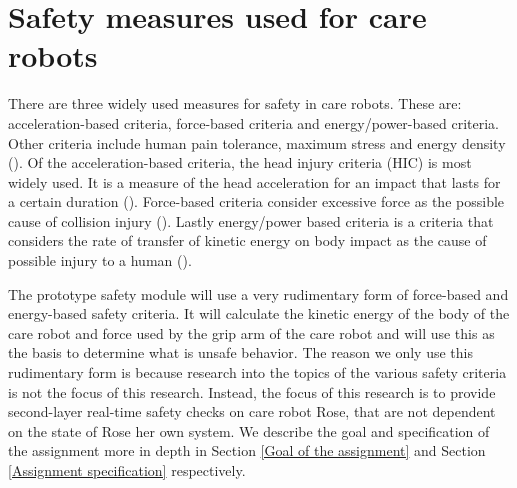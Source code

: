 \documentclass[12pt]{scrreprt}
\begin{document}
 \section{Safety measures used for care robots}
 \label{Safety in care robots}
There are three widely used measures for safety in care robots. These are: acceleration-based criteria,  force-based criteria and energy/power-based criteria. Other criteria include human pain tolerance, maximum stress and energy density (\cite{tadele}). Of the acceleration-based criteria, the head injury criteria (HIC) is most widely used. It is a measure of the head acceleration for an impact that lasts for a certain duration (\cite{hic}). Force-based criteria consider excessive force as the possible cause of collision injury (\cite{force}). Lastly energy/power based criteria is a criteria that considers the rate of transfer of kinetic energy on body impact as the cause of possible injury to a human (\cite{crucial_milestone}).
\par
The prototype safety module will use a very rudimentary form of force-based and energy-based safety criteria. It will calculate the kinetic energy of the body of the care robot and force used by the grip arm of the care robot and will use this as the basis to determine what is unsafe behavior. The reason we only use this rudimentary form is because research into the topics of the various safety criteria is not the focus of this research. Instead, the focus of this research is to provide second-layer real-time safety checks on care robot Rose, that are not dependent on the state of Rose her own system. We describe the goal and specification of the assignment more in depth in Section \ref{Goal of the assignment} and Section \ref{Assignment specification} respectively.
 
\end{document}
